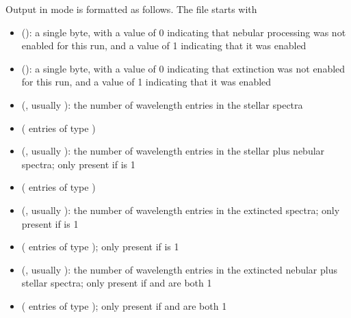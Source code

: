 \documentclass[letterpaper,10pt,english]{sphinxmanual}
\begin{document}
Output in  mode is formatted as follows.  The file starts with
\begin{itemize}
\item {} 
 (): a single byte, with a value of 0 indicating that nebular processing was not enabled for this run, and a value of 1 indicating that it was enabled

\item {} 
 (): a single byte, with a value of 0 indicating that extinction was not enabled for this run, and a value of 1 indicating that it was enabled

\item {} 
 (, usually ): the number of wavelength entries in the stellar spectra

\item {} 
 ( entries of type )

\item {} 
 (, usually ): the number of wavelength entries in the stellar plus nebular spectra; only present if  is 1

\item {} 
 ( entries of type )

\item {} 
 (, usually ): the number of wavelength entries in the extincted spectra; only present if  is 1

\item {} 
 ( entries of type ); only present if  is 1

\item {} 
 (, usually ): the number of wavelength entries in the extincted nebular plus stellar spectra; only present if  and  are both 1

\item {} 
 ( entries of type ); only present if  and  are both 1

\end{itemize}
\end{document}
